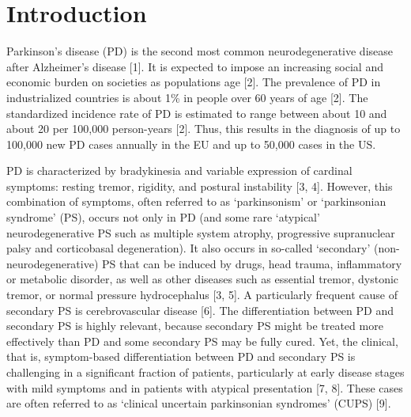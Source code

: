 \section{Introduction}
\label{sec:intro}


Parkinson's disease (PD) is the second most common neurodegenerative disease after Alzheimer's disease [1]. 
It is expected to impose an increasing social and economic burden on societies as populations age [2]. 
The prevalence of PD in industrialized countries is about 1\% in people over 60 years of age [2]. 
The standardized incidence rate of PD is estimated to range between about 10 and about 20 per 100,000 person-years [2]. 
Thus, this results in the diagnosis of up to 100,000 new PD cases annually in the EU and up to 50,000 cases in the US.


PD is characterized by bradykinesia and variable expression of cardinal symptoms: resting tremor, rigidity, and postural instability [3, 4]. 
However, this combination of symptoms, often referred to as `parkinsonism' or `parkinsonian syndrome' (PS), 
occurs not only in PD (and some rare `atypical' neurodegenerative PS such as multiple system atrophy, progressive 
supranuclear palsy and corticobasal degeneration). 
It also occurs in so-called `secondary' (non-neurodegenerative) PS that can be induced by drugs, head trauma, 
inflammatory or metabolic disorder, as well as other diseases such as essential tremor, dystonic tremor, or normal pressure hydrocephalus [3, 5]. 
A particularly frequent cause of secondary PS is cerebrovascular disease [6]. 
The differentiation between PD and secondary PS is highly relevant, 
because secondary PS might be treated more effectively than PD and some secondary PS may be fully cured.
Yet, the clinical, that is, symptom-based differentiation between PD and secondary PS is challenging in a significant fraction of patients, 
particularly at early disease stages with mild symptoms and in patients with atypical presentation [7, 8]. 
These cases are often referred to as `clinical uncertain parkinsonian syndromes' (CUPS) [9].


